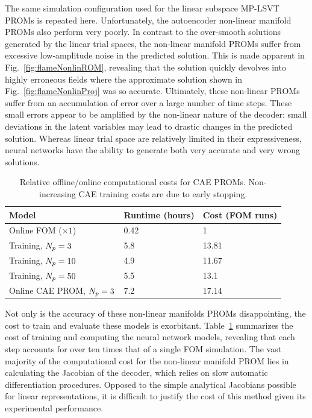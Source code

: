 The same simulation configuration used for the linear subspace MP-LSVT PROMs is repeated here. Unfortunately, the autoencoder non-linear manifold PROMs also perform very poorly. In contrast to the over-smooth solutions generated by the linear trial spaces, the non-linear manifold PROMs suffer from excessive low-amplitude noise in the predicted solution. This is made apparent in Fig.~\ref{fig:flameNonlinROM}, revealing that the solution quickly devolves into highly erroneous fields where the approximate solution shown in Fig.~\ref{fig:flameNonlinProj} was so accurate. Ultimately, these non-linear PROMs suffer from an accumulation of error over a large number of time steps. These small errors appear to be amplified by the non-linear nature of the decoder: small deviations in the latent variables may lead to drastic changes in the predicted solution. Whereas linear trial space are relatively limited in their expressiveness, neural networks have the ability to generate both very accurate and very wrong solutions.

\begin{table}
	\centering
	\begin{tabular}{ lll }
	\toprule
	Model & Runtime (hours) & Cost (FOM runs)  \\
	\midrule
    Online FOM ($\times 1$) & 0.42 & 1 \\
    Training, $N_p = 3$ & 5.8 & 13.81 \\
    Training, $N_p = 10$ & 4.9 & 11.67 \\
    Training, $N_p = 50$ & 5.5 & 13.1 \\
    Online CAE PROM, $N_p = 3$ & 7.2 & 17.14 \\
	\bottomrule
	\end{tabular}
	\caption{\label{tab:caeCost}Relative offline/online computational costs for CAE PROMs. Non-increasing CAE training costs are due to early stopping.}
\end{table}

Not only is the accuracy of these non-linear manifolds PROMs disappointing, the cost to train and evaluate these models is exorbitant. Table~\ref{tab:caeCost} summarizes the cost of training and computing the neural network models, revealing that each step accounts for over ten times that of a single FOM simulation. The vast majority of the computational cost for the non-linear manifold PROM lies in calculating the Jacobian of the decoder, which relies on slow automatic differentiation procedures. Opposed to the simple analytical Jacobians possible for linear representations, it is difficult to justify the cost of this method given its experimental performance.

